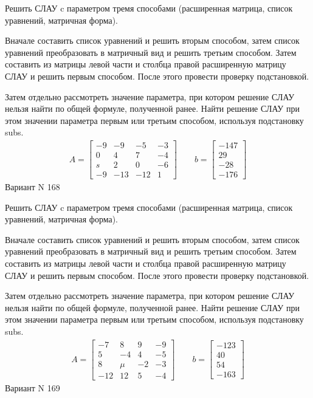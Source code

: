\documentclass[11pt]{report}
\begin{document}
Решить СЛАУ c параметром тремя способами (расширенная матрица, список уравнений, матричная форма).

Вначале составить список уравнений и решить вторым способом,
затем список уравнений преобразовать в матричный вид и решить третьим способом.
Затем составить из матрицы левой части и столбца правой расширенную матрицу СЛАУ и решить первым способом.
После этого провести проверку подстановкой.

Затем отдельно рассмотреть значение параметра, при котором решение СЛАУ нельзя найти по общей формуле,
полученной ранее.
Найти решение СЛАУ при этом значении параметра первым или третьим способом, используя подстановку subs.
\begin{align*}
    A = \left[\begin{matrix}-9 & -9 & -5 & -3\\0 & 4 & 7 & -4\\s & 2 & 0 & -6\\-9 & -13 & -12 & 1\end{matrix}\right]
\qquad b = \left[\begin{matrix}-147\\29\\-28\\-176\end{matrix}\right]
\end{align*}
\newpage
Вариант N 168


Решить СЛАУ c параметром тремя способами (расширенная матрица, список уравнений, матричная форма).

Вначале составить список уравнений и решить вторым способом,
затем список уравнений преобразовать в матричный вид и решить третьим способом.
Затем составить из матрицы левой части и столбца правой расширенную матрицу СЛАУ и решить первым способом.
После этого провести проверку подстановкой.

Затем отдельно рассмотреть значение параметра, при котором решение СЛАУ нельзя найти по общей формуле,
полученной ранее.
Найти решение СЛАУ при этом значении параметра первым или третьим способом, используя подстановку subs.
\begin{align*}
    A = \left[\begin{matrix}-7 & 8 & 9 & -9\\5 & -4 & 4 & -5\\8 & \mu & -2 & -3\\-12 & 12 & 5 & -4\end{matrix}\right]
\qquad b = \left[\begin{matrix}-123\\40\\54\\-163\end{matrix}\right]
\end{align*}
\newpage
Вариант N 169
\end{document}
